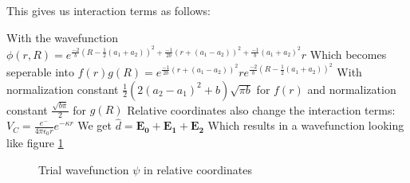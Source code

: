This gives us interaction terms as follows:

With the wavefunction
$\phi(r, R) = e^{
    \frac{-2}{b}(R-\frac{1}{2}(a_1+a_2))^2+
    \frac{-1}{2b}(r+(a_1-a_2))^2+
    \frac{-1}{b}(a_1+a_2)^2}r$
Which becomes seperable into $f(r)g(R) = 
e^{\frac{-1}{2b}(r+(a_1-a_2))^2}r
e^{\frac{-2}{b}(R-\frac{1}{2}(a_1+a_2))^2}$
With normalization constant $\frac{1}{2}(2 (a_2-a_1)^2 + b) \sqrt{\pi b}$ for $f(r)$ and normalization constant $\frac{\sqrt{b \pi}}{2}$ for $g(R)$
Relative coordinates also change the interaction terms:
$V_C = \frac{e^-}{4\pi \epsilon_0 r} e ^{-\kappa r}$
We get $\hat{d} = \mathbf{E_0} + \mathbf{E_1} + \mathbf{E_2}$
Which results in a wavefunction looking like figure \ref{fig:relative_wf}

\begin{figure}[h]
    \centering
    
    \caption{Trial wavefunction $\psi$ in relative coordinates}
    \label{fig:relative_wf}
\end{figure}